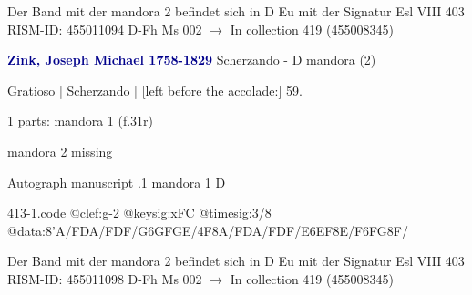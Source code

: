 \documentclass[twocolumn]{book}
\begin{document}
\newline Der Band mit der mandora 2 befindet sich in D Eu mit der Signatur Esl VIII 403
\newline RISM-ID: 455011094
\newline D-Fh  Ms 002
\newline $\rightarrow$ In collection 419 (455008345)
      
\newline \par \vspace{7pt} \textcolor{darkblue}{\textbf{Zink, Joseph Michael  1758-1829}}
\newline Scherzando - D
\newline mandora (2)
\newline \begin{itshape}[f.31r, at left:] Gratioso | Scherzando | [left before the accolade:] 59.\end{itshape} 
\newline \textcolor{darkblue}{}  1 parts: mandora 1  (f.31r)
\newline \begin{small} mandora 2 missing\end{small} 
\newline Autograph manuscript
.1  mandora 1  D  
\begin{filecontents*}{413-1.code}
@clef:g-2
@keysig:xFC
@timesig:3/8
@data:8'A/FDA/FDF/{G6GFGE}/4F8A/FDA/FDF/{E6EF8E}/{F6FG8F}/
\end{filecontents*}
\newline
%

\newline Der Band mit der mandora 2 befindet sich in D Eu mit der Signatur Esl VIII 403
\newline RISM-ID: 455011098
\newline D-Fh  Ms 002
\newline $\rightarrow$ In collection 419 (455008345)
      
\end{document}
